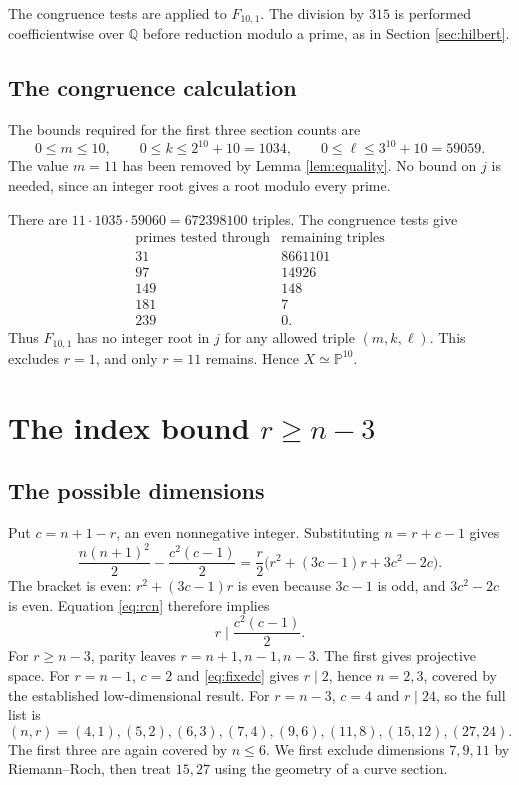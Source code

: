 \documentclass[11pt,reqno,letterpaper]{amsart}
\newcommand{\Q}{\mathbb Q}
\newcommand{\PP}{\mathbb P}
\theoremstyle{definition}
\numberwithin{equation}{section}
\begin{document}
The congruence tests are applied to $F_{10,1}$. The division by $315$
is performed coefficientwise over $\Q$ before reduction modulo a prime,
as in Section \ref{sec:hilbert}.

\subsection{The congruence calculation}
The bounds required for the first three section counts are
\[
 0\le m\le10,\qquad0\le k\le2^{10}+10=1034,\qquad
 0\le\ell\le3^{10}+10=59059.
\]
The value $m=11$ has been removed by Lemma \ref{lem:equality}.
No bound on $j$ is needed, since an integer root gives a root modulo
every prime.

There are $11\cdot1035\cdot59060=672398100$ triples. The congruence tests give
\[
\begin{array}{r|r}
 \text{primes tested through}&\text{remaining triples}\\ \hline
31&8661101\\97&14926\\149&148\\181&7\\239&0.
\end{array}
\]
Thus $F_{10,1}$ has no integer root in $j$ for any allowed triple
$(m,k,\ell)$.
This excludes $r=1$, and only $r=11$ remains. Hence $X\simeq\PP^{10}$.

\section{The index bound \texorpdfstring{$r\ge n-3$}{r >=  n-3}}\label{sec:high}

\subsection{The possible dimensions}
Put $c=n+1-r$, an even nonnegative integer. Substituting $n=r+c-1$ gives
\[
 \frac{n(n+1)^2}{2}-\frac{c^2(c-1)}2
 =\frac r2\bigl(r^2+(3c-1)r+3c^2-2c\bigr).
\]
The bracket is even: $r^2+(3c-1)r$ is even because $3c-1$ is odd,
and $3c^2-2c$ is even. Equation \eqref{eq:rcn} therefore implies
\begin{equation}\label{eq:fixedc}
 r\mid\frac{c^2(c-1)}2.
\end{equation}
For $r\ge n-3$, parity leaves $r=n+1,n-1,n-3$.
The first gives projective space.
For $r=n-1$, $c=2$ and \eqref{eq:fixedc} gives $r\mid2$,
hence $n=2,3$, covered by the established low-dimensional result.
For $r=n-3$, $c=4$ and $r\mid24$, so the full list is
\begin{equation}\label{eq:highpairs}
 (n,r)=(4,1),(5,2),(6,3),(7,4),(9,6),(11,8),(15,12),(27,24).
\end{equation}
The first three are again covered by $n\le6$.
We first exclude dimensions $7,9,11$ by Riemann--Roch, then treat
$15,27$ using the geometry of a curve section.
\end{document}
